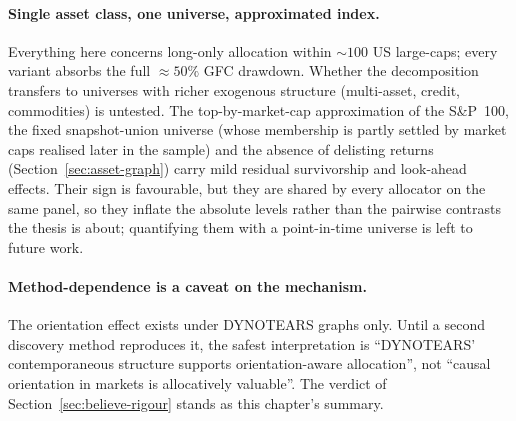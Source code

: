 \paragraph{Single asset class, one universe, approximated index.} Everything
here concerns long-only allocation within ${\sim}100$ US large-caps; every
variant absorbs the full ${\approx}50\%$ GFC drawdown. Whether the
decomposition transfers to universes with richer exogenous structure
(multi-asset, credit, commodities) is untested. The top-by-market-cap
approximation of the S\&P~100, the fixed snapshot-union universe (whose
membership is partly settled by market caps realised later in the
sample) and the absence of delisting returns
(Section~\ref{sec:asset-graph}) carry
mild residual survivorship and look-ahead effects. Their sign is
favourable, but they are shared by every allocator on the same panel, so
they inflate the absolute levels rather than the pairwise contrasts the
thesis is about; quantifying them with a point-in-time universe is left
to future work.

\paragraph{Method-dependence is a caveat on the mechanism.} The orientation
effect exists under DYNOTEARS graphs only. Until a second discovery method
reproduces it, the safest interpretation is ``DYNOTEARS' contemporaneous
structure supports orientation-aware allocation'', not ``causal orientation
in markets is allocatively valuable''. The verdict of
Section~\ref{sec:believe-rigour} stands as this chapter's summary.
